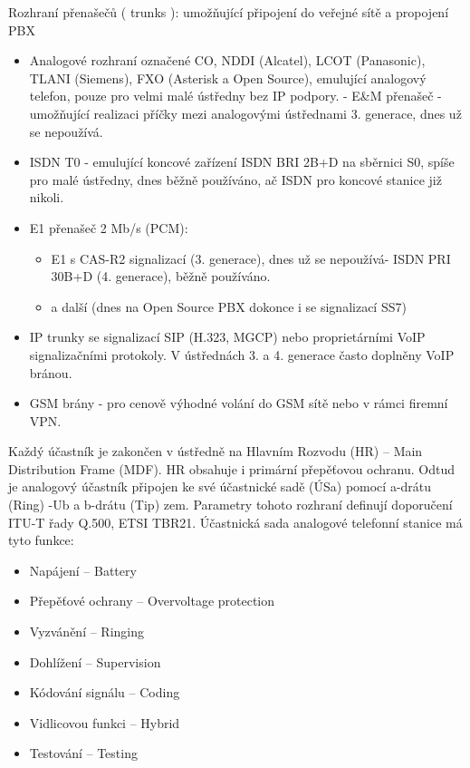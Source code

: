 Rozhraní přenašečů ( trunks ):
umožňující připojení do veřejné sítě a propojení PBX
\begin{itemize}[noitemsep]
    \item Analogové rozhraní označené CO, NDDI (Alcatel), LCOT (Panasonic), TLANI (Siemens), FXO (Asterisk a Open Source), emulující analogový telefon, pouze pro velmi malé ústředny bez IP podpory. - E\&M přenašeč - umožňující realizaci příčky mezi analogovými ústřednami 3. generace, dnes už se nepoužívá.
    \item ISDN T0 - emulující koncové zařízení ISDN BRI 2B+D na sběrnici S0, spíše pro malé ústředny, dnes běžně používáno, ač ISDN pro koncové stanice již nikoli.
    \item E1 přenašeč 2 Mb/s (PCM):
    \begin{itemize}[noitemsep]
        \item E1 s CAS-R2 signalizací (3. generace), dnes už se nepoužívá- ISDN PRI 30B+D (4. generace), běžně používáno.
        \item a další (dnes na Open Source PBX dokonce i se signalizací SS7)
    \end{itemize}
    \item IP trunky se signalizací SIP (H.323, MGCP) nebo proprietárními VoIP signalizačními protokoly. V ústřednách 3. a 4. generace často doplněny VoIP bránou.
    \item GSM brány - pro cenově výhodné volání do GSM sítě nebo v rámci firemní VPN.
\end{itemize}


Každý účastník je zakončen v ústředně na Hlavním Rozvodu (HR) -- Main Distribution Frame (MDF). HR obsahuje i primární přepěťovou ochranu. Odtud je analogový účastník připojen ke své účastnické sadě (ÚSa) pomocí a-drátu (Ring) -Ub a b-drátu (Tip) zem. Parametry tohoto rozhraní definují doporučení ITU-T řady Q.500, ETSI TBR21. Účastnická sada analogové telefonní stanice má tyto funkce:

\begin{itemize}[noitemsep]
    \item Napájení -- Battery
    \item Přepěťové ochrany -- Overvoltage protection
    \item Vyzvánění -- Ringing
    \item Dohlížení -- Supervision
    \item Kódování signálu -- Coding
    \item Vidlicovou funkci -- Hybrid
    \item Testování -- Testing
\end{itemize}

